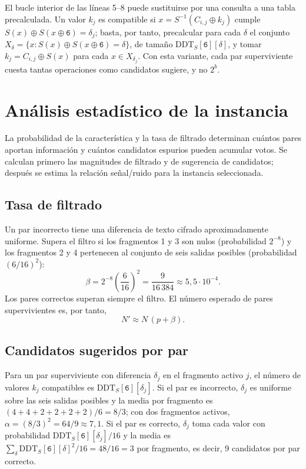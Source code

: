 El bucle interior de las líneas 5--8 puede sustituirse por una consulta a una tabla precalculada. Un valor \(k_j\) es compatible si \(x=S^{-1}(C_{i,j}\oplus k_j)\) cumple \(S(x)\oplus S(x\oplus\texttt{6})=\delta_j\); basta, por tanto, precalcular para cada \(\delta\) el conjunto \(X_\delta=\{x: S(x)\oplus S(x\oplus\texttt{6})=\delta\}\), de tamaño \(\mathrm{DDT}_S[\texttt{6}][\delta]\), y tomar \(k_j=C_{i,j}\oplus S(x)\) para cada \(x\in X_{\delta_j}\). Con esta variante, cada par superviviente cuesta tantas operaciones como candidatos sugiere, y no \(2^b\).

\section{Análisis estadístico de la instancia}
\label{sec:estadistica}

La probabilidad de la característica y la tasa de filtrado determinan cuántos pares aportan información y cuántos candidatos espurios pueden acumular votos. Se calculan primero las magnitudes de filtrado y de sugerencia de candidatos; después se estima la relación señal/ruido para la instancia seleccionada.

\subsection{Tasa de filtrado}

Un par incorrecto tiene una diferencia de texto cifrado aproximadamente uniforme. Supera el filtro si los fragmentos 1 y 3 son nulos (probabilidad \(2^{-8}\)) y los fragmentos 2 y 4 pertenecen al conjunto de seis salidas posibles (probabilidad \((6/16)^2\)):
\begin{equation}
 \beta=2^{-8}\left(\frac{6}{16}\right)^2=\frac{9}{16\,384}\approx 5{,}5\cdot 10^{-4}.
 \label{eq:beta}
\end{equation}
Los pares correctos superan siempre el filtro. El número esperado de pares supervivientes es, por tanto,
\begin{equation}
 N'\approx N\,(p+\beta).
 \label{eq:nprima}
\end{equation}

\subsection{Candidatos sugeridos por par}

Para un par superviviente con diferencia \(\delta_j\) en el fragmento activo \(j\), el número de valores \(k_j\) compatibles es \(\mathrm{DDT}_S[\texttt{6}][\delta_j]\). Si el par es incorrecto, \(\delta_j\) es uniforme sobre las seis salidas posibles y la media por fragmento es \((4+4+2+2+2+2)/6=8/3\); con dos fragmentos activos, \(\alpha=(8/3)^2=64/9\approx 7{,}1\). Si el par es correcto, \(\delta_j\) toma cada valor con probabilidad \(\mathrm{DDT}_S[\texttt{6}][\delta_j]/16\) y la media es \(\sum_\delta \mathrm{DDT}_S[\texttt{6}][\delta]^2/16=48/16=3\) por fragmento, es decir, 9 candidatos por par correcto.

